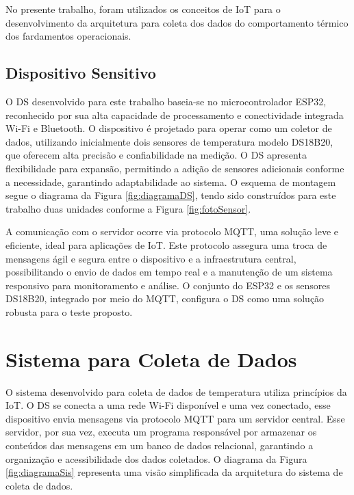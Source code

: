 	  No presente trabalho, foram utilizados os conceitos de \acrlong{IoT} para o desenvolvimento da arquitetura para coleta dos dados do comportamento térmico
	   dos fardamentos operacionais.

\subsection{Dispositivo Sensitivo}

	O \acrfull{DS} desenvolvido para este trabalho baseia-se no microcontrolador ESP32, reconhecido por sua alta capacidade de processamento e conectividade
	 integrada Wi-Fi e Bluetooth. O dispositivo é projetado para operar como um coletor de dados, utilizando inicialmente dois sensores de temperatura modelo DS18B20,
	  que oferecem alta precisão e confiabilidade na medição. O \acrshort{DS} apresenta flexibilidade para expansão, permitindo a adição de sensores adicionais conforme a
	   necessidade, garantindo adaptabilidade ao sistema. O esquema de montagem segue o diagrama da Figura \ref{fig:diagramaDS}, tendo sido construídos para
	    este trabalho duas unidades conforme a Figura \ref{fig:fotoSensor}.



	\tab A comunicação com o servidor ocorre via protocolo \acrfull{MQTT}, uma solução leve e eficiente, ideal para aplicações de
	 \acrlong{IoT}. Este protocolo assegura uma troca de mensagens ágil e segura entre o dispositivo e a infraestrutura central, 
	 possibilitando o envio de dados em tempo real e a manutenção de um sistema responsivo para monitoramento e análise. O conjunto do ESP32 e
	  os sensores DS18B20, integrado por meio do \acrshort{MQTT}, configura o \acrshort{DS} como uma solução robusta para o teste proposto.
	
\section{Sistema para Coleta de Dados}

	O sistema desenvolvido para coleta de dados de temperatura utiliza princípios da \acrlong{IoT}. 
	O \acrlong{DS} se conecta a uma rede Wi-Fi disponível e uma vez conectado, esse dispositivo envia 
	mensagens via protocolo \acrshort{MQTT} para um servidor central. Esse servidor, por sua vez, executa um programa responsável por armazenar os conteúdos das mensagens em um banco de dados relacional, garantindo a organização e acessibilidade dos dados coletados. O diagrama da Figura \ref{fig:diagramaSis} representa uma visão simplificada da arquitetura do sistema de coleta de dados.

